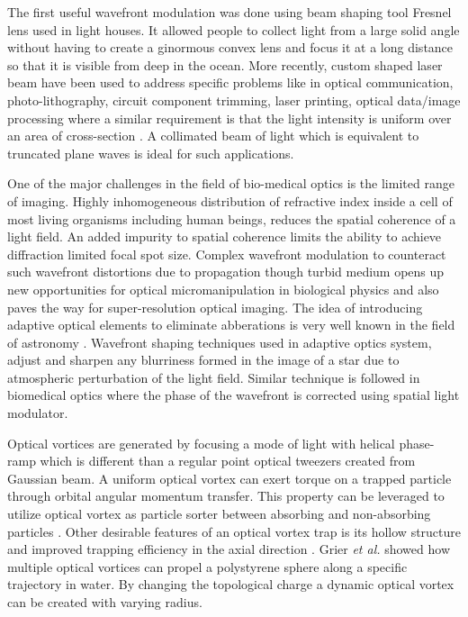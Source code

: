 The first useful wavefront modulation was done using beam shaping tool Fresnel lens used in light houses. It allowed people to collect light from a large solid angle without having to create a ginormous convex lens and focus it at a long distance so that it is visible from deep in the ocean. More recently, custom shaped laser beam have been used to address specific problems like in optical communication, photo-lithography, circuit component trimming, laser printing, optical data/image processing where a similar requirement is that the light intensity is uniform over an area of cross-section \cite{Dickey03}. A collimated beam of light which is equivalent to truncated plane waves is ideal for such applications. 

One of the major challenges in the field of bio-medical optics is the limited range of imaging. Highly inhomogeneous distribution of refractive index inside a cell of most living organisms including human beings, reduces the spatial coherence of a light field. An added impurity to spatial coherence limits the ability to achieve diffraction limited focal spot size. Complex wavefront modulation to counteract such wavefront distortions due to propagation though turbid medium opens up new opportunities for optical micromanipulation in biological physics and also paves the way for super-resolution optical imaging. The idea of introducing adaptive optical elements to eliminate abberations is very well known in the field of astronomy \cite{Beuzit1997, beuzit1994}. Wavefront shaping techniques used in adaptive optics system, adjust and sharpen any blurriness formed in the image of a star due to atmospheric perturbation of the light field. Similar technique is followed in biomedical optics where the phase of the wavefront is corrected using spatial light modulator.

Optical vortices are generated by focusing a mode of light with helical phase-ramp which is different than a regular point optical tweezers created from Gaussian beam. A uniform optical vortex can exert torque on a trapped particle through orbital angular momentum transfer. This property can be leveraged to utilize optical vortex as particle sorter between absorbing and non-absorbing particles \cite{ONEIL2000139, Parkin:06, chavez2003}. Other desirable features of an optical vortex trap is its hollow structure and improved trapping efficiency in the axial direction \cite{NIEMINEN2008195}. Grier \emph{et al.} \cite{Curtis:03}  showed how multiple optical vortices can propel a polystyrene sphere along a specific trajectory in water. By changing the topological charge a dynamic optical vortex can be created with varying radius. 

